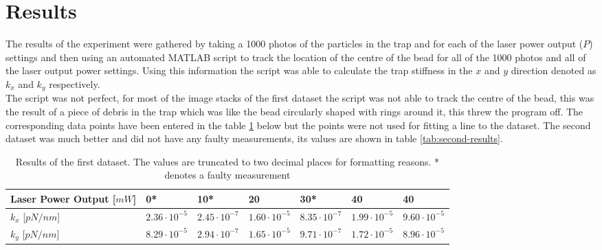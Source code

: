 \section{Results}
The results of the experiment were gathered by taking a 1000 photos of the particles in the trap and for each of the laser power output ($P$) settings and then using an automated MATLAB script to track the location of the centre of the bead for all of the 1000 photos and all of the laser output power settings. Using this information the script was able to calculate the trap stiffness in the $x$ and $y$ direction denoted as $k_x$ and $k_y$ respectively.\\
The script was not perfect, for most of the image stacks of the first dataset the script was not able to track the centre of the bead, this was the result of a piece of debris in the trap which was like the bead circularly shaped with rings around it, this threw the program off. The corresponding data points have been entered in the table \ref{tab:first-results} below but the points were not used for fitting a line to the dataset. The second dataset was much better and did not have any faulty measurements, its values are shown in table \ref{tab:second-results}.\\


\begin{table}[h!]

\begin{tabular}{|l|l|l|l|l|l|l|}
\hline
Laser Power Output {[}$mW${]} & 0*         & 10*        & 20        & 30*        & 40         & 40        \\ \hline
$k_x$    {[}$pN/nm${]}        & $2.36 \cdot 10^{-5}$ &$ 2.45 \cdot 10^{-7}$ & $1.60\cdot 10^{-5}$  & $8.35\cdot 10^{-7}$ & $1.99\cdot 10^{-5}$  & $9.60\cdot 10^{-5}$ \\ \hline
$k_y$     {[}$pN/nm${]}       & $8.29 \cdot 10^{-5}$ &$ 2.94\cdot 10^{-7}$ & $1.65\cdot 10^{-5}$ & $9.71\cdot 10^{-7}$ & $1.72\cdot 10^{-5}$ & $8.96\cdot 10^{-5}$ \\ \hline
\end{tabular}
\caption{Results of the first dataset. The values are truncated to two decimal places for formatting reasons. * denotes a faulty measurement}
\label{tab:first-results}
\end{table}


